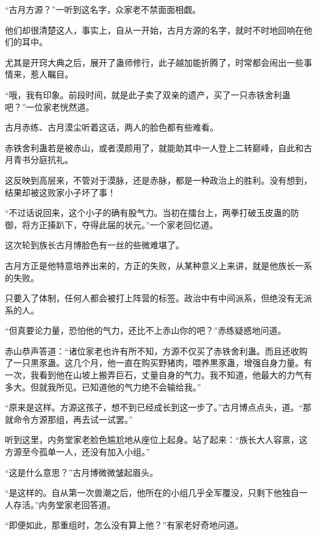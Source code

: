 
\begin{this_body}



“古月方源？”一听到这名字，众家老不禁面面相觑。

他们却很清楚这人，事实上，自从一开始，古月方源的名字，就时不时地回响在他们的耳中。

尤其是开窍大典之后，展开了蛊师修行，此子越加能折腾了，时常都会闹出一些事情来，惹人瞩目。

“哦，我有印象。前段时间，就是此子卖了双亲的遗产，买了一只赤铁舍利蛊吧？”一位家老恍然道。

古月赤练、古月漠尘听着这话，两人的脸色都有些难看。

赤铁舍利蛊若是被赤山，或者漠颜用了，就能助其中一人登上二转巅峰，自此和古月青书分庭抗礼。

这反映到高层来，不管对于漠脉，还是赤脉，都是一种政治上的胜利。没有想到，结果却被这败家小子坏了事！

“不过话说回来，这个小子的确有股气力。当初在擂台上，两拳打破玉皮蛊的防御，将方正揍趴下，夺得此届的状元。”一个家老回忆道。

这次轮到族长古月博脸色有一丝的些微难堪了。

古月方正是他特意培养出来的，方正的失败，从某种意义上来讲，就是他族长一系的失败。

只要入了体制，任何人都会被打上阵营的标签。政治中有中间派系，但绝没有无派系的人。

“但真要论力量，恐怕他的气力，还比不上赤山你的吧？”赤练疑惑地问道。

赤山恭声答道：“诸位家老也许有所不知，方源不仅买了赤铁舍利蛊。而且还收购了一只黒豕蛊。这几个月，他一直在购买野猪肉，喂养黒豕蛊，增强自身力量。有一次，我看到他在山坡上搬弄巨石，丈量自身的气力。我不知道，他最大的力气有多大。但就我所见。已知道他的气力绝不会输给我。”

“原来是这样。方源这孩子，想不到已经成长到这一步了。”古月博点点头，道。“那就命令方源那组，再去试一试罢。”

听到这里，内务堂家老脸色尴尬地从座位上起身。站了起来：“族长大人容禀，这方源至今孤单一人，还没有加入小组。”

“这是什么意思？”古月博微微皱起眉头。

“是这样的。自从第一次兽潮之后，他所在的小组几乎全军覆没，只剩下他独自一人存活。”内务堂家老回答道。

“即便如此，那重组时，怎么没有算上他？”有家老好奇地问道。


\end{this_body}
